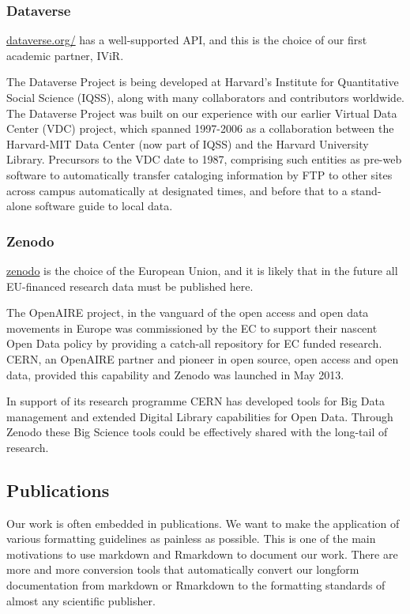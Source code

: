 \documentclass[
  fontsize=13pt,
  english,
  a4paper,
  openany, a4paper, oneside]{article}
\begin{document}
\hypertarget{dataverse}{%
\subsubsection{Dataverse}\label{dataverse}}

\href{https://dataverse.org/}{dataverse.org/} has a well-supported API, and this is the choice of our first academic partner, IViR.

The Dataverse Project is being developed at Harvard's Institute for Quantitative Social Science (IQSS), along with many collaborators and contributors worldwide. The Dataverse Project was built on our experience with our earlier Virtual Data Center (VDC) project, which spanned 1997-2006 as a collaboration between the Harvard-MIT Data Center (now part of IQSS) and the Harvard University Library. Precursors to the VDC date to 1987, comprising such entities as pre-web software to automatically transfer cataloging information by FTP to other sites across campus automatically at designated times, and before that to a stand-alone software guide to local data.

\hypertarget{zenodo}{%
\subsubsection{Zenodo}\label{zenodo}}

\href{https://zenodo.org/}{zenodo} is the choice of the European Union, and it is likely that in the future all EU-financed research data must be published here.

The OpenAIRE project, in the vanguard of the open access and open data movements in Europe was commissioned by the EC to support their nascent Open Data policy by providing a catch-all repository for EC funded research. CERN, an OpenAIRE partner and pioneer in open source, open access and open data, provided this capability and Zenodo was launched in May 2013.

In support of its research programme CERN has developed tools for Big Data management and extended Digital Library capabilities for Open Data. Through Zenodo these Big Science tools could be effectively shared with the long-tail of research.

\hypertarget{publications}{%
\subsection{Publications}\label{publications}}

Our work is often embedded in publications. We want to make the application of various formatting guidelines as painless as possible. This is one of the main motivations to use markdown and Rmarkdown to document our work. There are more and more conversion tools that automatically convert our longform documentation from markdown or Rmarkdown to the formatting standards of almost any scientific publisher.
\end{document}
